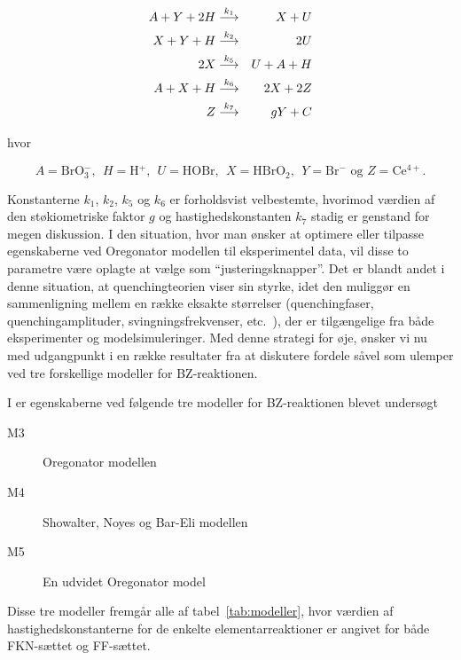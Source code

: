 \begin{eqnarray} 
 \label{eq:orgdiff}
 A + Y + 2H & \stackrel{k_1}{\longrightarrow} & X + U     \nonumber \\
 X + Y + H  & \stackrel{k_2}{\longrightarrow} & 2U        \nonumber \\
 2X         & \stackrel{k_5}{\longrightarrow} & U + A + H           \\ 
 A + X + H  & \stackrel{k_6}{\longrightarrow} & 2X + 2Z   \nonumber \\ 
 Z          & \stackrel{k_7}{\longrightarrow} & gY + C    \nonumber  
\end{eqnarray}  

hvor

$$
 A = \mbox{BrO$_3^-$, }\;
 H = \mbox{H$^+$, }\;
 U = \mbox{HOBr, }\;
 X = \mbox{HBrO$_2$, }\;
 Y = \mbox{Br$^-$ og }
 Z = \mbox{Ce$^{4+}$.}
$$

Konstanterne $k_1$, $k_2$, $k_5$ og $k_6$ er forholdsvist
velbestemte, hvorimod v{\ae}rdien af den st{\o}kiometriske
faktor $g$ og hastighedskonstanten $k_7$ stadig er genstand
for megen diskussion. I den situation, hvor man {\o}nsker
at optimere eller tilpasse egenskaberne ved Oregonator
model\-len til eksperimentel data, vil disse to parametre
v{\ae}re oplagte at v{\ae}lge som ``justeringsknapper''.
Det er blandt andet i denne situation, at quenchingteorien
viser sin styrke, idet den muligg{\o}r en sammenlig\-ning
mellem en r{\ae}kke eksakte st{\o}rrelser (quenching\-faser,
quenchingamplituder, sving\-ningsfrekvenser, etc.\ ), der er
tilg{\ae}ngelige fra b{\aa}de eksperi\-menter og
model\-simuleringer. Med denne strategi for {\o}je, {\o}nsker
vi nu med udgangpunkt i en r{\ae}kke resultater fra
\cite{HopfQuench} at diskutere fordele s{\aa}vel som
ulemper ved tre forskellige model\-ler for BZ-reaktionen.
 
\vspace{4.0mm}
I \cite{HopfQuench} er egenskaberne ved f{\o}lgende tre model\-ler 
for BZ-reaktionen blevet unders{\o}gt

\begin{center}
  \begin{description}
    \item[M3] Oregonator model\-len
    \item[M4] Showalter, Noyes og Bar-Eli model\-len
    \item[M5] En udvidet Oregonator model
  \end{description}
\end{center}

Disse tre model\-ler fremg{\aa}r alle af
tabel~\ref{tab:modeller}, hvor v{\ae}rdien af
hastighedskonstanterne for de enkelte elementarreaktioner
er angivet for b{\aa}de FKN-s{\ae}ttet og FF-s{\ae}ttet.


